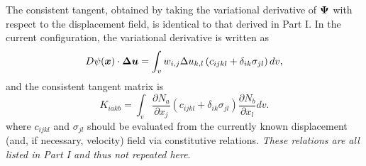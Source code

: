 The consistent tangent, obtained by taking the variational derivative of $\bm{\Psi}$ with respect to the displacement field, is identical to that derived in Part I.
In the current configuration, the variational derivative is written as 
\begin{equation}
    D\psi(\bm{x}) \cdot \bm{\Delta \bm{u}} = \int_v w_{i,j} \Delta u_{k,l} \left( c_{ijkl} + \delta_{ik} \sigma_{jl} \right) dv,
\end{equation}
and the consistent tangent matrix is 
\begin{equation}
    K_{iakb} = \int_v \frac{\partial N_a}{\partial x_j} \left( c_{ijkl} + \delta_{ik} \sigma_{jl} \right) \frac{\partial N_b}{\partial x_l} dv.
\end{equation}
where $c_{ijkl}$ and $\sigma_{jl}$ should be evaluated from the currently known displacement (and, if necessary, velocity) field via constitutive relations. 
\emph{These relations are all listed in Part I and thus not repeated here}. 

